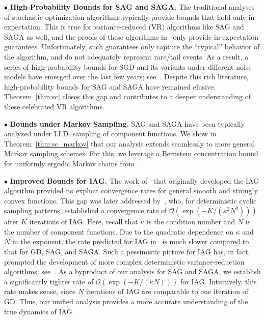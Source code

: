 \documentclass{article}
\theoremstyle{plain}
\theoremstyle{definition}
\newcommand{\cO}{\mathcal{O}}
\newcommand{\bigo}[1]{\cO\left( #1\right)}
\begin{document}
$\bullet$ \textbf{High-Probability Bounds for SAG and SAGA.} The traditional analyses of stochastic optimization algorithms typically provide bounds that hold only in expectation. This is true for variance-reduced (VR) algorithms like SAG and SAGA as well, and the  proofs of these algorithms in~\citet{SAG, SAG_proof, SAGA} only provide in-expectation guarantees. Unfortunately, such guarantees only capture the ``typical'' behavior of the algorithm, and do not adequately represent rare/tail events. As a result, a series of high-probability bounds for SGD and its variants under different noise models have emerged over the last few years; see~\citet{HPB1, HPB2, HPB3}. Despite this rich literature, high-probability bounds for SAG and SAGA have remained elusive. Theorem~\ref{thm:sc} closes this gap and contributes to a deeper understanding of these celebrated VR algorithms.  

$\bullet$ \textbf{Bounds under Markov Sampling.} SAG and SAGA have been typically analyzed under I.I.D. sampling of component functions. We  show in Theorem~\ref{thm:sc_markov} that our analysis extends seamlessly to more general Markov sampling schemes. For this, we leverage a Bernstein concentration bound for uniformly ergodic Markov chains from~\citet{paulin2015concentration}. 

$\bullet$ \textbf{Improved Bounds for IAG.} The work of~\citet{blatt2007convergent} that originally developed the IAG algorithm provided no explicit convergence rates for general smooth and strongly convex functions. This gap was later addressed by~\citet{gurbuzbalaban2017convergence}, who, for deterministic cyclic sampling patterns, established a convergence rate of $\bigo{\exp(-K/(\kappa^2 N^2))}$ after $K$ iterations of IAG. Here, recall that $\kappa$ is the condition number and $N$ is the number of component functions. Due to the quadratic dependence on $\kappa$ and $N$ in the exponent, the rate predicted for IAG in~\citet{gurbuzbalaban2017convergence} is much slower compared to that for GD, SAG, and SAGA. Such a pessimistic picture for IAG has, in fact,  prompted the development of more complex deterministic variance-reduction algorithms; see~\citet{mokhtari2018surpassing}. As a byproduct of our analysis for SAG and SAGA, we establish a significantly tighter rate of $\bigo{\exp(-K/(\kappa N))}$ for IAG. Intuitively, this rate makes sense, since $N$ iterations of IAG are comparable to one iteration of GD. Thus, our unified analysis provides a more accurate understanding of the true dynamics of IAG. 
\end{document}
